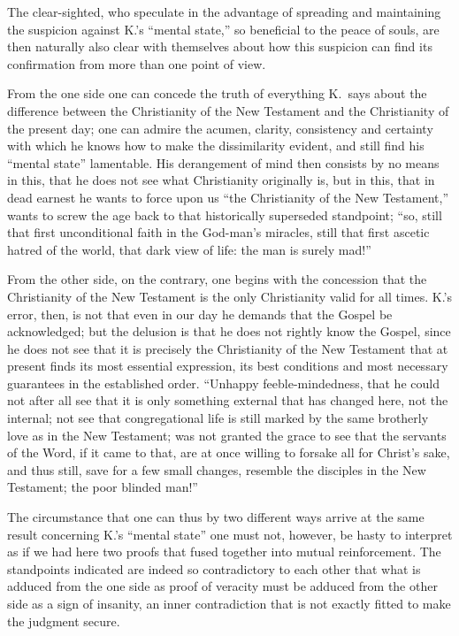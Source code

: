 \documentclass[12pt,a4paper]{article}
\newcommand{\opage}[1]{\marginnote{\footnotesize\textit{[#1]}}}
\begin{document}
The clear-sighted, who speculate in the advantage of spreading
and maintaining the suspicion against K.'s ``mental state,''
so beneficial to the peace of souls, are then naturally
also clear with themselves about how
this suspicion can find its confirmation from more than one
point of view.

From the one side one can concede the truth of
everything K.\ says about the difference between the Christianity
of the New Testament and the Christianity of the present day; one
can admire the acumen, clarity, consistency
and certainty with which he knows how to make the dissimilarity
evident, and still find his ``mental state'' lamentable.
His derangement of mind then consists by no means
in this, that he does not see what Christianity originally is,
but in this, that in dead earnest he wants to force upon us ``the
Christianity of the New Testament,'' wants to screw the age
back to that historically superseded standpoint; ``so,
still that first unconditional faith in the God-man's
miracles, still that first ascetic hatred of the world, that
dark view of life: the man is surely mad!''

From the other side, on the contrary, one begins with
the concession that the Christianity of the New Testament
is the only Christianity valid for all times.
K.'s error, then, is not that even in our day he
demands that the Gospel be acknowledged; but the delusion is that
\opage{4}
he does not rightly know the Gospel, since he does not see
that it is precisely the Christianity of the New Testament that
at present finds its most essential expression, its best conditions
and most necessary guarantees in the established order.
``Unhappy feeble-mindedness, that he could not after all see
that it is only something external that has changed here, not the
internal; not see that congregational life is still marked
by the same brotherly love as in the New
Testament; was not granted the grace to see that the servants of the Word,
if it came to that, are at once willing to forsake
all for Christ's sake, and thus still, save for a few
small changes, resemble the disciples in the New Testament;
the poor blinded man!''

The circumstance that one can thus by two different
ways arrive at the same result concerning K.'s
``mental state'' one must not, however, be hasty
to interpret as if we had here two proofs that fused
together into mutual reinforcement. The standpoints indicated
are indeed so contradictory to each other that what
is adduced from the one side as proof of veracity
must be adduced from the other side as a sign of insanity,
an inner contradiction that is not exactly fitted to
make the judgment secure.
\end{document}
